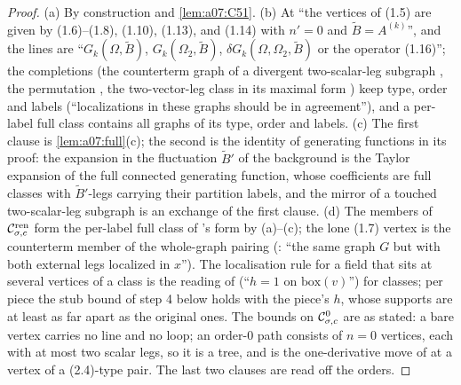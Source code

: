 \begin{proof}
(a) By construction and \cref{lem:a07:C51}. (b) At \cite[p.~414]{Ba3} ``the vertices of (1.5) are given by (1.6)--(1.8), (1.10), (1.13), and (1.14) with $n'=0$ and $\tilde B=A^{(k)}$'', and the lines are ``$G_k(\Omega,\tilde B)$, $G_k(\Omega_2,\tilde B)$, $\delta G_k(\Omega,\Omega_2,\tilde B)$ or the operator (1.16)''; the completions (the counterterm graph of a divergent two-scalar-leg subgraph \cite[p.~420]{Ba3}, the permutation \cite[p.~429]{Ba3}, the two-vector-leg class in its maximal form \cite[p.~431]{Ba3}) keep type, order and labels (``localizations in these graphs should be in agreement''), and a per-label full class contains all graphs of its type, order and labels. (c) The first clause is \cref{lem:a07:full}(c); the second is the identity of generating functions in its proof: the expansion in the fluctuation $\tilde B'$ of the background is the Taylor expansion of the full connected generating function, whose coefficients are full classes with $\tilde B'$-legs carrying their partition labels, and the mirror of a touched two-scalar-leg subgraph is an exchange of the first clause. (d) The members of $\mathcal C^{\mathrm{ren}}_{\sigma,c}$ form the per-label full class of \cite[Prop.~1]{Ba3}'s form by (a)--(c); the lone (1.7) vertex is the counterterm member of the whole-graph pairing (\cite[p.~417]{Ba3}: ``the same graph $G$ but with both external legs localized in $x$''). The localisation rule for a field that sits at several vertices of a class is the reading of \cite[p.~420]{Ba3} (``$h=1$ on $\mathrm{box}(v)$'') for classes; per piece the stub bound of step 4 below holds with the piece's $h$, whose supports are at least as far apart as the original ones. The bounds on $\mathcal C^0_{\sigma,c}$ are as stated: a bare vertex carries no line and no loop; an order-$0$ path consists of $n=0$ vertices, each with at most two scalar legs, so it is a tree, and \cite[(2.8)]{Ba3} is the one-derivative move of \cite[Sect.~2]{Ba3} at a vertex of a (2.4)-type pair. The last two clauses are read off the orders.
\end{proof}

